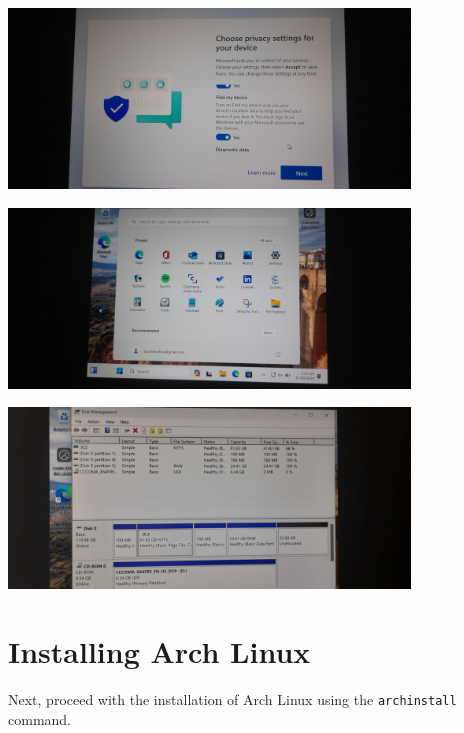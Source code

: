 \documentclass[a4paper]{article}
\begin{document}
\begin{center}
    \includegraphics[width=0.8\textwidth]{22.jpeg} %
\end{center}
\begin{center}
    \includegraphics[width=0.8\textwidth]{23.jpeg} %
\end{center}

\begin{center}
    \includegraphics[width=0.8\textwidth]{24.jpeg} %
\end{center}

\section{Installing Arch Linux}
Next, proceed with the installation of Arch Linux using the \texttt{archinstall} command.
\end{document}
